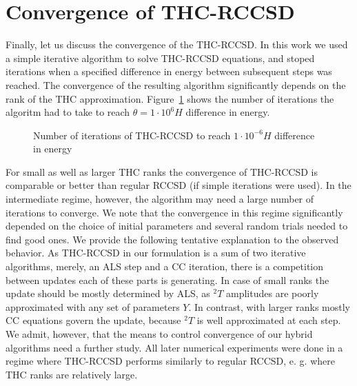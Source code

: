 \section{Convergence of THC-RCCSD}
Finally, let us discuss the convergence of the THC-RCCSD. In this 
work we used a simple iterative algorithm to solve THC-RCCSD equations, 
and stoped iterations when a specified difference in energy between subsequent 
steps was reached. The convergence of the resulting algorithm significantly 
depends on the rank of the THC approximation. 
Figure~\ref{fig:cc_thc_convergence} shows the number of iterations the algoritm 
had to take to reach $\theta = 1\cdot 10^{6} H$ difference in energy.
%
\begin{figure}[tb]
\caption{Number of iterations of THC-RCCSD to reach $1 \cdot 10^{-6} H$ 
difference in energy}
\label{fig:cc_thc_convergence}
\end{figure}
%
For small as well as larger THC ranks the convergence of THC-RCCSD is 
comparable or better than regular RCCSD (if simple iterations were used). In 
the intermediate regime, however, the algorithm may need
a large number of iterations to converge. We note that the convergence in this 
regime significantly depended on the choice of initial parameters and several 
random trials needed to find good ones. We provide the following tentative 
explanation to the observed behavior. As 
THC-RCCSD in our formulation is a sum of two iterative algorithms, merely, an 
ALS step and a CC iteration, there is a competition between 
updates each of these parts is generating. In case of small ranks the update 
should be mostly determined by ALS, as ${}^{2}T$ amplitudes are poorly 
approximated with any set of parameters $Y$. In 
contrast, with larger ranks mostly CC equations govern the update, because 
${}^2T$ is well approximated at each step. We admit, however, that the means to 
control convergence of our hybrid algorithms 
need a further study. All later numerical experiments were done in a regime 
where THC-RCCSD performs similarly to regular RCCSD, e. g. where THC ranks are 
relatively large. 

